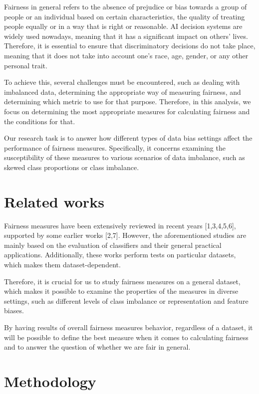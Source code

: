 \documentclass[sn-vancouver]{sn-jnl}%
\theoremstyle{thmstyleone}%
\theoremstyle{thmstyletwo}%
\theoremstyle{thmstylethree}%
\begin{document}
Fairness in general refers to the absence of prejudice or bias towards a group of people or an individual based on certain characteristics, the quality of treating people equally or in a way that is right or reasonable. AI decision systems are widely used nowadays, meaning that it has a significant impact on others' lives. Therefore, it is essential to ensure that discriminatory decisions do not take place, meaning that it does not take into account one's race, age, gender, or any other personal trait.

To achieve this, several challenges must be encountered, such as dealing with imbalanced data, determining the appropriate way of measuring fairness, and determining which metric to use for that purpose. Therefore, in this analysis, we focus on determining the most appropriate measures for calculating fairness and the conditions for that. 

Our research task is to answer how different types of data bias settings affect the performance of fairness measures. Specifically, it concerns examining the susceptibility of these measures to various scenarios of data imbalance, such as skewed class proportions or class imbalance.

\section{Related works}\label{sec2}

Fairness measures have been extensively reviewed in recent years [1,3,4,5,6], supported by some earlier works [2,7]. However, the aforementioned studies are mainly based on the evaluation of classifiers and their general practical applications. Additionally, these works perform tests on particular datasets, which makes them dataset-dependent. 

Therefore, it is crucial for us to study fairness measures on a general dataset, which makes it possible to examine the properties of the measures in diverse settings, such as different levels of class imbalance or representation and feature biases. 

By having results of overall fairness measures behavior, regardless of a dataset, it will be possible to define the best measure when it comes to calculating fairness and to answer the question of whether we are fair in general.

\section{Methodology}\label{sec3}
\end{document}
